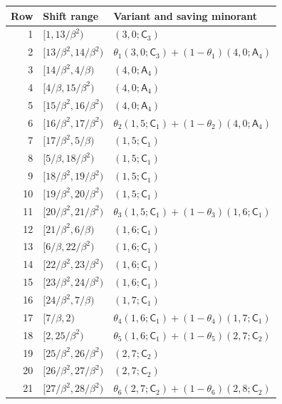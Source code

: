 \begin{center}\small
\begin{tabular}{rll}
\hline Row&Shift range&Variant and saving minorant\\\hline
1&$[1,13/\beta^2)$&$(3,0;\mathsf C_{3})$\\
2&$[13/\beta^2,14/\beta^2)$&$\theta_{1}(3,0;\mathsf C_{3})+(1-\theta_{1})(4,0;\mathsf A_{4})$\\
3&$[14/\beta^2,4/\beta)$&$(4,0;\mathsf A_{4})$\\
4&$[4/\beta,15/\beta^2)$&$(4,0;\mathsf A_{4})$\\
5&$[15/\beta^2,16/\beta^2)$&$(4,0;\mathsf A_{4})$\\
6&$[16/\beta^2,17/\beta^2)$&$\theta_{2}(1,5;\mathsf C_{1})+(1-\theta_{2})(4,0;\mathsf A_{4})$\\
7&$[17/\beta^2,5/\beta)$&$(1,5;\mathsf C_{1})$\\
8&$[5/\beta,18/\beta^2)$&$(1,5;\mathsf C_{1})$\\
9&$[18/\beta^2,19/\beta^2)$&$(1,5;\mathsf C_{1})$\\
10&$[19/\beta^2,20/\beta^2)$&$(1,5;\mathsf C_{1})$\\
11&$[20/\beta^2,21/\beta^2)$&$\theta_{3}(1,5;\mathsf C_{1})+(1-\theta_{3})(1,6;\mathsf C_{1})$\\
12&$[21/\beta^2,6/\beta)$&$(1,6;\mathsf C_{1})$\\
13&$[6/\beta,22/\beta^2)$&$(1,6;\mathsf C_{1})$\\
14&$[22/\beta^2,23/\beta^2)$&$(1,6;\mathsf C_{1})$\\
15&$[23/\beta^2,24/\beta^2)$&$(1,6;\mathsf C_{1})$\\
16&$[24/\beta^2,7/\beta)$&$(1,7;\mathsf C_{1})$\\
17&$[7/\beta,2)$&$\theta_{4}(1,6;\mathsf C_{1})+(1-\theta_{4})(1,7;\mathsf C_{1})$\\
18&$[2,25/\beta^2)$&$\theta_{5}(1,6;\mathsf C_{1})+(1-\theta_{5})(2,7;\mathsf C_{2})$\\
19&$[25/\beta^2,26/\beta^2)$&$(2,7;\mathsf C_{2})$\\
20&$[26/\beta^2,27/\beta^2)$&$(2,7;\mathsf C_{2})$\\
21&$[27/\beta^2,28/\beta^2)$&$\theta_{6}(2,7;\mathsf C_{2})+(1-\theta_{6})(2,8;\mathsf C_{2})$\\
\hline\end{tabular}\end{center}
